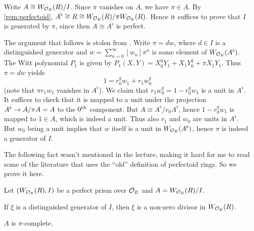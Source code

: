 \begin{proof*}
	Write $A\cong W_{\mathcal{O}_E}(R)/I$. Since $\pi$ vanishes on $A$, we have $\pi\in A$. By \cref{rem:perfectoid}, $A^\flat\cong R\cong W_{\mathcal{O}_E}(R)/\pi W_{\mathcal{O}_E}(R)$. Hence it suffices to prove that $I$ is generated by $\pi$, since then $A\cong A^\flat$ is perfect.
	
	The argument that follows is stolen from \cite[Lemma~3.10]{BMS}. Write $\pi=dw$, where $d\in I$ is a distinguished generator and $w=\sum_{n=0}^\infty [w_n]\pi^n$ is some element of $W_{\mathcal{O}_E}(A^\flat)$. The Witt polynomial $P_1$ is given by $P_1(X,Y)=X_0^qY_1+X_1Y_0^q+\pi X_1Y_1$. Thus $\pi=dw$ yields
	\begin{equation*}
		1=r_0^qw_1+r_1w_0^q
	\end{equation*}
	(note that $\pi r_1w_1$ vanishes in $A^\flat$). We claim that $r_1w_0^q=1-r_0^qw_1$ is a unit in $A^\flat$. It suffices to check that it is mapped to a unit under the projection $A^\flat\morphism A/\pi A=A$ to the $0^{\text{th}}$ component. But $A\cong A^\flat/r_0A^\flat$, hence $1-r_0^qw_1$ is mapped to $1\in A$, which is indeed a unit. Thus also $r_1$ and $w_0$ are units in $A^\flat$. But $w_0$ being a unit implies that $w$ itself is a unit in $W_{\mathcal{O}_E}(A^\flat)$, hence $\pi$ is indeed a generator of $I$.
\end{proof*}
The following fact wasn't mentioned in the lecture, making it hard for me to read some of the literature that uses the \enquote{old} definition of perfectoid rings. So we prove it here.
\begin{lem*}\label{lem*:perfectoidComplete}
	Let $(W_{\mathcal{O}_E}(R),I)$ be a perfect prism over $\mathcal{O}_E$ and $A=W_{\mathcal{O}_E}(R)/I$.
	\begin{alphanumerate}
		\item If $\xi$ is a distinguished generator of $I$, then $\xi$ is a non-zero divisor in $W_{\mathcal{O}_E}(R)$.
		\item $A$ is $\pi$-complete.
	\end{alphanumerate}
\end{lem*}
